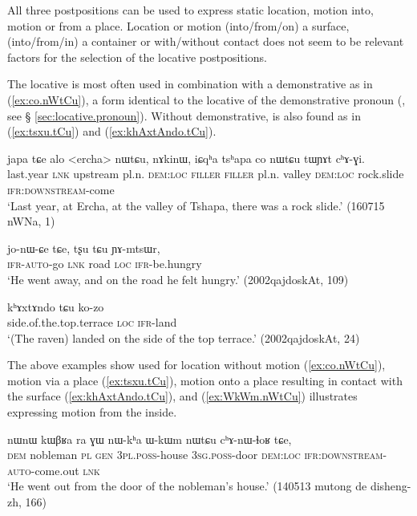 All three postpositions can be used to express static location, motion into, motion or from a place. Location or motion (into/from/on) a surface, (into/from/in) a container or with/without contact does not seem to be relevant factors for the selection of the locative postpositions.

The locative   is most often used in combination with a demonstrative  as in (\ref{ex:co.nWtCu}), a form identical to the locative of the demonstrative pronoun (, see § \ref{sec:locative.pronoun}). Without demonstrative,  is also found as in (\ref{ex:tsxu.tCu}) and (\ref{ex:khAxtAndo.tCu}).

\begin{exe}
\ex \label{ex:co.nWtCu}
\gll japa tɕe alo <ercha> nɯtɕu, nɤkinɯ, iɕqʰa tsʰapa co nɯtɕu tɯɲɤt cʰɤ-ɣi. \\
last.year \textsc{lnk} upstream pl.n. \textsc{dem}:\textsc{loc} \textsc{filler}   \textsc{filler}  pl.n. valley \textsc{dem}:\textsc{loc} rock.slide \textsc{ifr}:\textsc{downstream}-come \\
\glt `Last year, at Ercha, at the valley of Tshapa, there was a rock slide.' (160715 nWNa, 1)
\end{exe}

\begin{exe}
\ex \label{ex:tsxu.tCu}
\gll jo-nɯ-ɕe tɕe, tʂu tɕu ɲɤ-mtsɯr, \\
\textsc{ifr}-\textsc{auto}-go \textsc{lnk} road \textsc{loc} \textsc{ifr}-be.hungry \\
\glt `He went away, and on the road he felt hungry.' (2002qajdoskAt, 109)
\end{exe}

\begin{exe}
\ex \label{ex:khAxtAndo.tCu}
\gll  kʰɤxtɤndo tɕu ko-zo \\
side.of.the.top.terrace \textsc{loc} \textsc{ifr}-land \\
\glt `(The raven) landed on the side of the top terrace.' (2002qajdoskAt, 24)
\end{exe}

The above examples show  used for location without motion (\ref{ex:co.nWtCu}), motion via a place (\ref{ex:tsxu.tCu}), motion onto a place resulting in contact with the surface (\ref{ex:khAxtAndo.tCu}), and (\ref{ex:WkWm.nWtCu}) illustrates  expressing motion from the inside.

\begin{exe}
\ex \label{ex:WkWm.nWtCu}
\gll nɯnɯ kɯβʁa ra ɣɯ nɯ-kʰa ɯ-kɯm nɯtɕu cʰɤ-nɯ-ɬoʁ tɕe, \\
\textsc{dem} nobleman \textsc{pl} \textsc{gen} \textsc{3pl}.\textsc{poss}-house \textsc{3sg}.\textsc{poss}-door \textsc{dem}:\textsc{loc} \textsc{ifr}:\textsc{downstream}-\textsc{auto}-come.out \textsc{lnk} \\
\glt  `He went out from the door of the nobleman's house.' (140513 mutong de disheng-zh, 166)
\end{exe}

